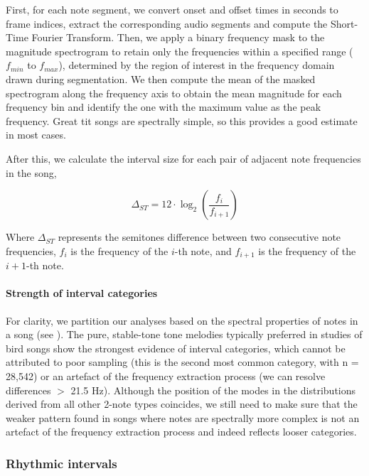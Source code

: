 First, for each note segment, we convert onset and offset times in seconds to frame indices, extract the corresponding audio segments and compute the Short-Time Fourier Transform. Then, we apply a binary frequency mask to the magnitude spectrogram to retain only the frequencies within a specified range ($f_{min}$ to $f_{max}$), determined by the region of interest in the frequency domain drawn during segmentation. We then compute the mean of the masked spectrogram along the frequency axis to obtain the mean magnitude for each frequency bin and identify the one with the maximum value as the peak frequency. Great tit songs are spectrally simple, so this provides a good estimate in most cases.

\noindent After this, we calculate the interval size for each pair of adjacent note frequencies in the song,

\begin{equation}
\Delta_{ST} = 12 \cdot \log_2\left(\frac{f_{i}}{f_{i+1}}\right)
\end{equation}

\noindent Where $\Delta_{ST}$ represents the semitones difference between two consecutive note frequencies, $f_{i}$ is the frequency of the $i$-th note, and $f_{i+1}$ is the frequency of the $i+1$-th note.


\paragraph{Strength of interval categories}
\label{c5:strength}
For clarity, we partition our analyses based on the spectral properties of notes in a song (see ). The pure, stable-tone tone melodies typically preferred in studies of bird songs \autocite{dobson1977, tierney2011a, doolittle2012, doolittle2014} show the strongest evidence of interval categories, which cannot be attributed to poor sampling (this is the second most common category, with n = 28,542) or an artefact of the frequency extraction process (we can resolve differences $>$ 21.5 Hz). Although the position of the modes in the distributions derived from all other 2-note types coincides, we still need to make sure that the weaker pattern found in songs where notes are spectrally more complex is not an artefact of the frequency extraction process and indeed reflects looser categories.


\subsubsection{Rhythmic intervals}

